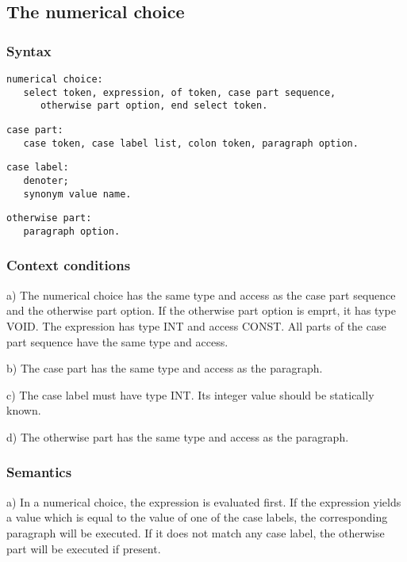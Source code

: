 \documentclass [a4paper,12pt,fleqn]{article}
\begin{document}
\subsection {The numerical choice}
\subsubsection*{Syntax}
\begin{letterlist}
\item
\begin{verbatim}
numerical choice:
   select token, expression, of token, case part sequence,
      otherwise part option, end select token.
\end{verbatim}
\item
\begin{verbatim}
case part:
   case token, case label list, colon token, paragraph option.
\end{verbatim}
\item
\begin{verbatim}
case label:
   denoter;
   synonym value name.
\end{verbatim}
\item
\begin{verbatim}
otherwise part:
   paragraph option.
\end{verbatim}
\end{letterlist}
\subsubsection*{Context conditions}
\begin{list}{-}{}
\item[a)]
The numerical choice has the same type and access as the case part sequence
and the otherwise part option. If the otherwise part option is emprt, it has
type VOID. The expression has type INT and access CONST. All parts of the
case part sequence have the same type and access.
\item[b)] 
The case part has the same type and access as the paragraph.
\item[c)]
The case label must have type INT. Its integer value should be statically known.
\item[d)]
The otherwise part has the same type and access as the paragraph.
\end{list}
\subsubsection*{Semantics}
\begin{list}{-}{}
\item[a)]
In a numerical choice, the expression is evaluated first. If the expression
yields a value which is equal to the value of one of the case labels, the
corresponding paragraph will be executed. If it does not match any case label,
the otherwise part will be executed if present.
\end{list}
\end{document}
